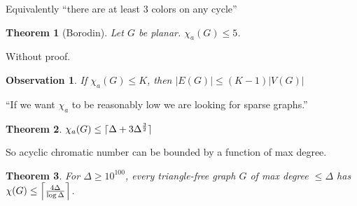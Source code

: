 \documentclass{article}
\newtheorem*{theorem}{Theorem}
\newtheorem*{observation}{Observation}
\begin{document}
\noindent
Equivalently \enquote{there are at least $3$ colors on any cycle}

\begin{theorem}[Borodin]
	Let $G$ be planar. $\chi_a(G) \le 5$.
\end{theorem}

\noindent
Without proof.

\begin{observation}
	If $\chi_a(G) \le K$, then $|E(G)| \le (K-1)|V(G)|$
\end{observation}

\noindent
\enquote{If we want $\chi_a$ to be reasonably low we are looking for sparse
graphs.}

\begin{theorem}
	$\chi_a(G) \le \lceil \Delta + 3 \Delta^{3 \over 2} \rceil$
\end{theorem}

\noindent
So acyclic chromatic number can be bounded by a function of max degree.

\begin{theorem}
	For $\Delta \ge 10^{100}$, every triangle-free graph $G$ of max degree
	$\le \Delta$ has $\chi(G) \le \left \lceil {{4\Delta} \over
	{\log{\Delta}}} \right \rceil$.
\end{theorem}
\end{document}
